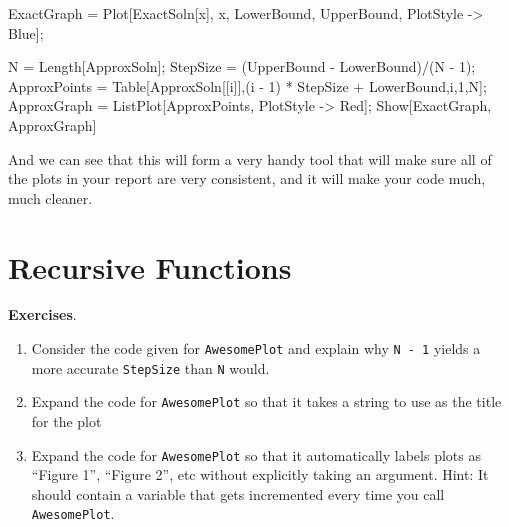 \begin{code}
	   ExactGraph = Plot[ExactSoln[x], {x, LowerBound, UpperBound}, PlotStyle -> Blue];

	   N = Length[ApproxSoln];
	   StepSize = (UpperBound - LowerBound)/(N - 1);
	   ApproxPoints = Table[{ApproxSoln[[i]],(i - 1) * StepSize + LowerBound},{i,1,N}];
	   ApproxGraph = ListPlot[ApproxPoints, PlotStyle -> Red];
	   Show[ExactGraph, ApproxGraph]
\end{code}

And we can see that this will form a very handy tool that will make sure all of the plots in your report are very consistent, and it will make your code much, much cleaner.

\section{Recursive Functions}


\textbf{Exercises}.
\begin{enumerate}
	   \item Consider the code given for \texttt{AwesomePlot} and explain why \texttt{N - 1} yields a more accurate \texttt{StepSize} than \texttt{N} would.
	   \item Expand the code for \texttt{AwesomePlot} so that it takes a string to use as the title for the plot
	   \item Expand the code for \texttt{AwesomePlot} so that it automatically labels plots as ``Figure 1'', ``Figure 2'', etc without explicitly taking an argument. Hint: It should contain a variable that gets incremented every time you call \texttt{AwesomePlot}. 
\end{enumerate}
